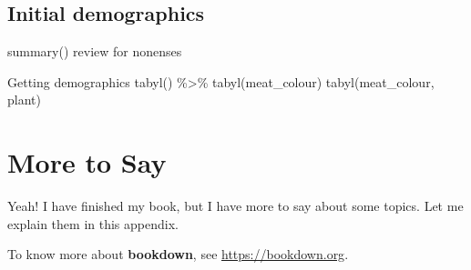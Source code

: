 \documentclass[
]{krantz}
\begin{document}
\hypertarget{initial-demographics}{%
\section{Initial demographics}\label{initial-demographics}}

summary() review for nonenses

Getting demographics
tabyl()
\%\textgreater\% tabyl(meat\_colour)
tabyl(meat\_colour, plant)

\cleardoublepage

\hypertarget{appendix-appendix}{%
\appendix {}}


\hypertarget{more-to-say}{%
\chapter{More to Say}\label{more-to-say}}

Yeah! I have finished my book, but I have more to say about some topics. Let me explain them in this appendix.

To know more about \textbf{bookdown}, see \url{https://bookdown.org}.

  

\backmatter
\printindex
\end{document}
